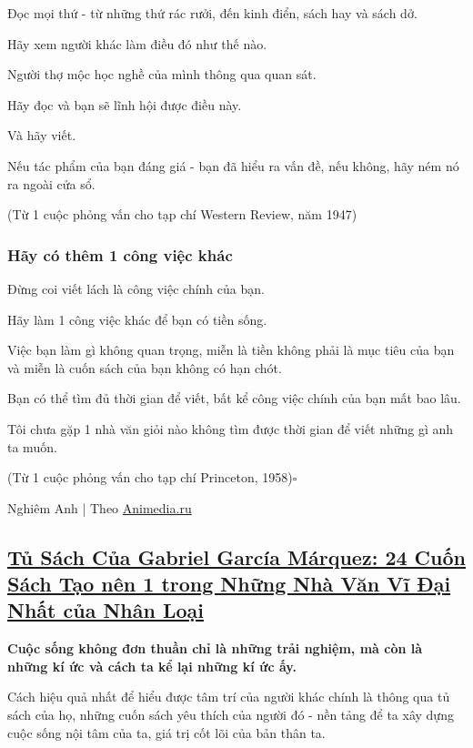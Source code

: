 \documentclass{article}
\begin{document}
Đọc mọi thứ - từ những thứ rác rưởi, đến kinh điển, sách hay và sách dở.

Hãy xem người khác làm điều đó như thế nào.

Người thợ mộc học nghề của mình thông qua quan sát.

Hãy đọc và bạn sẽ lĩnh hội được điều này.

Và hãy viết.

Nếu tác phẩm của bạn đáng giá - bạn đã hiểu ra vấn đề, nếu không, hãy ném nó ra ngoài cửa sổ.

(Từ 1 cuộc phỏng vấn cho tạp chí Western Review, năm 1947)

\subsubsection{Hãy có thêm 1 công việc khác}
Đừng coi viết lách là công việc chính của bạn.

Hãy làm 1 công việc khác để bạn có tiền sống.

Việc bạn làm gì không quan trọng, miễn là tiền không phải là mục tiêu của bạn và miễn là cuốn sách của bạn không có hạn chót.

Bạn có thể tìm đủ thời gian để viết, bất kể công việc chính của bạn mất bao lâu.

Tôi chưa gặp 1 nhà văn giỏi nào không tìm được thời gian để viết những gì anh ta muốn.

(Từ 1 cuộc phỏng vấn cho tạp chí Princeton, 1958)\hfill$\square$

\begin{flushright}
	Nghiêm Anh | Theo \url{Animedia.ru}
\end{flushright}


\subsection{\href{http://tramdoc.vn/tin-tuc/tu-sach-cua-gabriel-garcia-marquez-24-cuon-sach-tao-nen-mot-trong-nhung-nha-van-vi-dai-nhat-cua-nhan-loai-nnOn1W.html}{Tủ Sách Của Gabriel García Márquez: 24 Cuốn Sách Tạo nên 1 trong Những Nhà Văn Vĩ Đại Nhất của Nhân Loại}}

\textbf{Cuộc sống không đơn thuần chỉ là những trải nghiệm, mà còn là những kí ức và cách ta kể lại những kí ức ấy.}

%
Cách hiệu quả nhất để hiểu được tâm trí của người khác chính là thông qua tủ sách của họ, những cuốn sách yêu thích của người đó - nền tảng để ta xây dựng cuộc sống nội tâm của ta, giá trị cốt lõi của bản thân ta.
\end{document}
